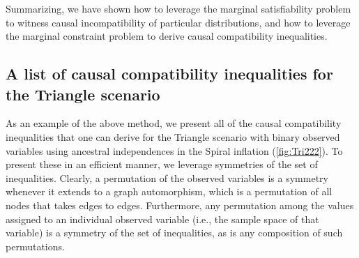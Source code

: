 \documentclass[aps,english,superscriptaddress,onecolumn,twoside,longbibliography,pra,floatfix,fleqn,nofootinbib]{revtex4-1}%
\theoremstyle{definition}
\newcounter{example}[section]
\begin{document}
Summarizing, we have shown how to leverage the marginal satisfiability problem to witness causal incompatibility of particular distributions, and how to leverage the marginal constraint problem to derive causal compatibility inequalities.


\subsection{A list of causal compatibility inequalities for the Triangle scenario}
\label{sec:CCineqs}

As an example of the above method, we present all of the causal compatibility inequalities that one can derive for the Triangle scenario with binary observed variables using ancestral independences in the Spiral inflation (\cref{fig:Tri222}). 
 To present these in an efficient manner, we leverage symmetries of the set of inequalities.  
Clearly, a permutation of the observed variables is a symmetry whenever it extends
to a graph automorphism, which is a permutation of all nodes that takes edges to edges. Furthermore, any permutation among the values assigned to an individual observed variable (i.e., the sample space of that variable) is a symmetry of the set of inequalities, as is any composition of such permutations. 
\end{document}
